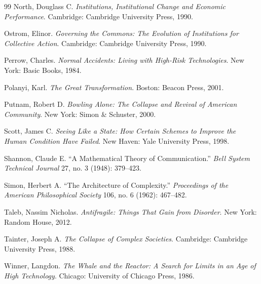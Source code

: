\documentclass[11pt, letterpaper]{article}
\begin{document}
\begin{thebibliography}{99}
North, Douglass C.
\textit{Institutions, Institutional Change and Economic Performance}.
Cambridge: Cambridge University Press, 1990.

Ostrom, Elinor.
\textit{Governing the Commons: The Evolution of Institutions for Collective Action}.
Cambridge: Cambridge University Press, 1990.

Perrow, Charles.
\textit{Normal Accidents: Living with High-Risk Technologies}.
New York: Basic Books, 1984.

Polanyi, Karl.
\textit{The Great Transformation}.
Boston: Beacon Press, 2001.

Putnam, Robert D.
\textit{Bowling Alone: The Collapse and Revival of American Community}.
New York: Simon \& Schuster, 2000.

Scott, James C.
\textit{Seeing Like a State: How Certain Schemes to Improve the Human Condition Have Failed}.
New Haven: Yale University Press, 1998.

Shannon, Claude E.
``A Mathematical Theory of Communication.''
\textit{Bell System Technical Journal}
27, no. 3 (1948): 379--423.

Simon, Herbert A.
``The Architecture of Complexity.''
\textit{Proceedings of the American Philosophical Society}
106, no. 6 (1962): 467--482.

Taleb, Nassim Nicholas.
\textit{Antifragile: Things That Gain from Disorder}.
New York: Random House, 2012.

Tainter, Joseph A.
\textit{The Collapse of Complex Societies}.
Cambridge: Cambridge University Press, 1988.

Winner, Langdon.
\textit{The Whale and the Reactor: A Search for Limits in an Age of High Technology}.
Chicago: University of Chicago Press, 1986.

\end{thebibliography}
\end{document}
